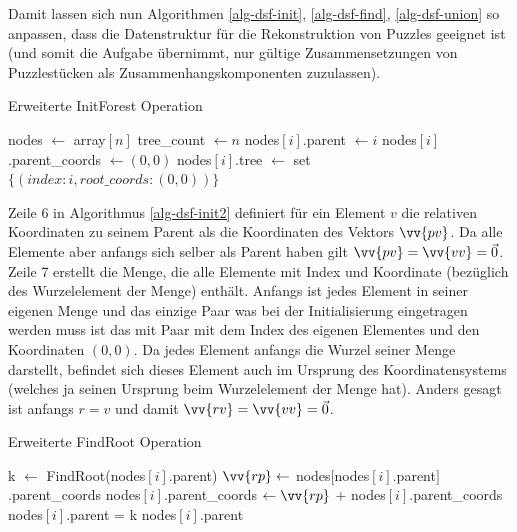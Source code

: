 \documentclass{whswinvcbook}
\begin{document}
Damit lassen sich nun Algorithmen \ref{alg-dsf-init}, \ref{alg-dsf-find}, \ref{alg-dsf-union} so anpassen, dass die Datenstruktur für die Rekonstruktion von Puzzles geeignet ist (und somit die Aufgabe übernimmt, nur gültige Zusammensetzungen von Puzzlestücken als Zusammenhangskomponenten zuzulassen).
\begin{algorithm}[H]
    \caption{Erweiterte InitForest Operation}\label{alg-dsf-init2}
    \begin{algorithmic}[1]
            \State nodes $\gets$ array$[n]$
            \State tree\_count $\gets n$
                \State nodes$[i]$.parent $\gets i$
                \State nodes$[i]$.parent\_coords $\gets(0,0)$
                \State nodes$[i]$.tree $\gets$ set$\{(index:i,root\_coords:(0,0))\}$
            \EndFor
        \EndProcedure
    \end{algorithmic}
\end{algorithm}
Zeile 6 in Algorithmus \ref{alg-dsf-init2} definiert für ein Element $v$ die relativen Koordinaten zu seinem Parent als die Koordinaten des Vektors $\vv{pv}$. Da alle Elemente aber anfangs sich selber als Parent haben gilt $\vv{pv}=\vv{vv}=\vec{0}$. Zeile 7 erstellt die Menge, die alle Elemente mit Index und Koordinate (bezüglich des Wurzelelement der Menge) enthält. Anfangs ist jedes Element in seiner eigenen Menge und das einzige Paar was bei der Initialisierung eingetragen werden muss ist das mit Paar mit dem Index des eigenen Elementes und den Koordinaten $(0,0)$. Da jedes Element anfangs die Wurzel seiner Menge darstellt, befindet sich dieses Element auch im Ursprung des Koordinatensystems (welches ja seinen Ursprung beim Wurzelelement der Menge hat). Anders gesagt ist anfangs $r=v$ und damit $\vv{rv}=\vv{vv}=\vec{0}$.
\begin{algorithm}[H]
    \caption{Erweiterte FindRoot Operation}\label{alg-dsf-find2}
    \begin{algorithmic}[1]
                \State k $\gets$ FindRoot(nodes$[i]$.parent)
                \State $\vv{rp}\gets$ nodes$[$nodes$[i]$.parent$]$.parent\_coords
                \State nodes$[i]$.parent\_coords $\gets\vv{rp}$ $+$ nodes$[i]$.parent\_coords
                \State nodes$[i]$.parent = k
            \EndIf
            \State \Return nodes$[i]$.parent
        \EndFunction
    \end{algorithmic}
\end{algorithm}
\end{document}
